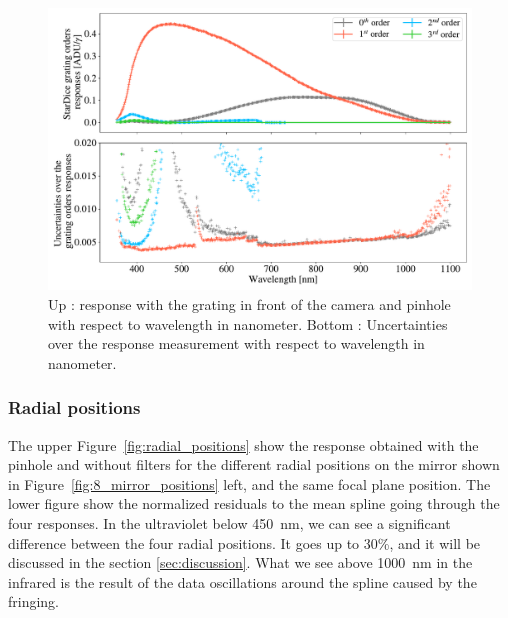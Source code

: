 \begin{figure}[h]
    \centering
    \includegraphics[width=\columnwidth]{fig/stardice_grating_response.pdf}
    \caption{Up : \SD response with the grating in front of the camera and \spinhole pinhole with respect to wavelength in nanometer. Bottom : Uncertainties over the \SD response measurement with respect to wavelength in nanometer.}
    \label{fig:stardice_grating_response}
\end{figure}

\subsubsection{Radial positions}

The upper Figure~\ref{fig:radial_positions} show the \SD response obtained with the \spinhole pinhole and without filters for the different radial positions on the mirror shown in Figure~\ref{fig:8_mirror_positions} left, and the same focal plane position. The lower figure show the normalized residuals to the mean spline going through the four responses. In the ultraviolet below \SI{450}{\nm}, we can see a significant difference between the four radial positions. It goes up to 30\%, and it will be discussed in the section \ref{sec:discussion}. What we see above \SI{1000}{\nm} in the infrared is the result of the data oscillations around the spline caused by the fringing. 


